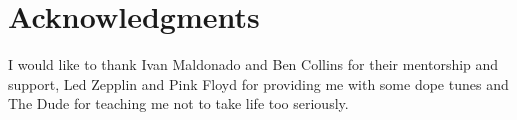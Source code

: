 \chapter*{Acknowledgments}
I would like to thank Ivan Maldonado and Ben Collins for their mentorship and support, Led Zepplin and Pink Floyd for providing me with some dope tunes and The Dude for teaching me not to take life too seriously.  